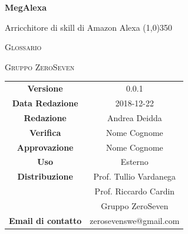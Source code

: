 \documentclass[a4paper,12pt]{article}
\author{Mirko Franco}
\date{2018-12-14}
\begin{document}
\begin{titlepage}
	\centering
	{\huge\bfseries MegAlexa\par}
	Arricchitore di skill di Amazon Alexa
	\line(1,0){350} \\
	{\scshape\LARGE Glossario \par}
	\vspace{1cm}
	{\scshape Gruppo ZeroSeven \par}
	\logo
		\begin{tabular}{c|c}
		{\hfill \textbf{Versione}} 			& 0.0.1				\\
		{\hfill\textbf{Data Redazione}} 	& 2018-12-22		\\ 
		{\hfill\textbf{Redazione}} 			& Andrea Deidda			\\ 
		{\hfill\textbf{Verifica}} 				&  	Nome Cognome				\\ 
		{\hfill\textbf{Approvazione}} 		&  		Nome Cognome			\\ 
		{\hfill\textbf{Uso}} 					& 		Esterno		\\ 
		{\hfill\textbf{Distribuzione}} 			& 			Prof. Tullio Vardanega \\ & Prof. Riccardo Cardin \\ & Gruppo ZeroSeven		\\ 
		{\hfill\textbf{Email di contatto}} & zerosevenswe@gmail.com \\
	\end{tabular}
\end{titlepage}

	\label{LastFrontPage}
	\newpage	
	
	\pagestyle{mymain}
	\tableofcontents
		
	
	
	
%	
	
	
%	
	
	
	
%	
	
	
%	
	
%	
	
	
	
	
	
	
	
	\printindex
	\label{LastPage}
	
	
\end{document}
